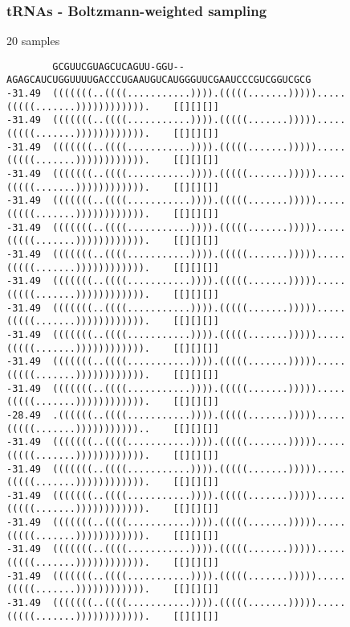 \documentclass[ignorenonframetext,10pt]{beamer}
\begin{document}
\begin{frame}[fragile]
  \frametitle{tRNAs - Boltzmann-weighted sampling}
  \tiny
  \begin{block}{\small 20 samples}
    \begin{verbatim}
        GCGUUCGUAGCUCAGUU-GGU--AGAGCAUCUGGUUUUGACCCUGAAUGUCAUGGGUUCGAAUCCCGUCGGUCGCG
-31.49  (((((((..((((...........)))).(((((.......))))).....(((((.......)))))))))))).    [[][][]]
-31.49  (((((((..((((...........)))).(((((.......))))).....(((((.......)))))))))))).    [[][][]]
-31.49  (((((((..((((...........)))).(((((.......))))).....(((((.......)))))))))))).    [[][][]]
-31.49  (((((((..((((...........)))).(((((.......))))).....(((((.......)))))))))))).    [[][][]]
-31.49  (((((((..((((...........)))).(((((.......))))).....(((((.......)))))))))))).    [[][][]]
-31.49  (((((((..((((...........)))).(((((.......))))).....(((((.......)))))))))))).    [[][][]]
-31.49  (((((((..((((...........)))).(((((.......))))).....(((((.......)))))))))))).    [[][][]]
-31.49  (((((((..((((...........)))).(((((.......))))).....(((((.......)))))))))))).    [[][][]]
-31.49  (((((((..((((...........)))).(((((.......))))).....(((((.......)))))))))))).    [[][][]]
-31.49  (((((((..((((...........)))).(((((.......))))).....(((((.......)))))))))))).    [[][][]]
-31.49  (((((((..((((...........)))).(((((.......))))).....(((((.......)))))))))))).    [[][][]]
-31.49  (((((((..((((...........)))).(((((.......))))).....(((((.......)))))))))))).    [[][][]]
-28.49  .((((((..((((...........)))).(((((.......))))).....(((((.......)))))))))))..    [[][][]]
-31.49  (((((((..((((...........)))).(((((.......))))).....(((((.......)))))))))))).    [[][][]]
-31.49  (((((((..((((...........)))).(((((.......))))).....(((((.......)))))))))))).    [[][][]]
-31.49  (((((((..((((...........)))).(((((.......))))).....(((((.......)))))))))))).    [[][][]]
-31.49  (((((((..((((...........)))).(((((.......))))).....(((((.......)))))))))))).    [[][][]]
-31.49  (((((((..((((...........)))).(((((.......))))).....(((((.......)))))))))))).    [[][][]]
-31.49  (((((((..((((...........)))).(((((.......))))).....(((((.......)))))))))))).    [[][][]]
-31.49  (((((((..((((...........)))).(((((.......))))).....(((((.......)))))))))))).    [[][][]]
    \end{verbatim}
  \end{block}
\end{frame}
\end{document}
